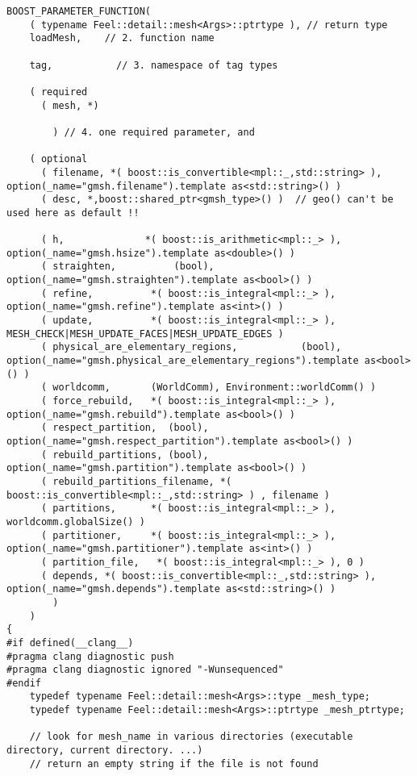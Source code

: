 \documentclass[12pt]{article}
\begin{document}
\begin{lstlisting}
BOOST_PARAMETER_FUNCTION(
    ( typename Feel::detail::mesh<Args>::ptrtype ), // return type
    loadMesh,    // 2. function name

    tag,           // 3. namespace of tag types

    ( required
      ( mesh, *)

        ) // 4. one required parameter, and

    ( optional
      ( filename, *( boost::is_convertible<mpl::_,std::string> ), option(_name="gmsh.filename").template as<std::string>() )
      ( desc, *,boost::shared_ptr<gmsh_type>() )  // geo() can't be used here as default !!

      ( h,              *( boost::is_arithmetic<mpl::_> ), option(_name="gmsh.hsize").template as<double>() )
      ( straighten,          (bool), option(_name="gmsh.straighten").template as<bool>() )
      ( refine,          *( boost::is_integral<mpl::_> ), option(_name="gmsh.refine").template as<int>() )
      ( update,          *( boost::is_integral<mpl::_> ), MESH_CHECK|MESH_UPDATE_FACES|MESH_UPDATE_EDGES )
      ( physical_are_elementary_regions,		   (bool), option(_name="gmsh.physical_are_elementary_regions").template as<bool>() )
      ( worldcomm,       (WorldComm), Environment::worldComm() )
      ( force_rebuild,   *( boost::is_integral<mpl::_> ), option(_name="gmsh.rebuild").template as<bool>() )
      ( respect_partition,	(bool), option(_name="gmsh.respect_partition").template as<bool>() )
      ( rebuild_partitions,	(bool), option(_name="gmsh.partition").template as<bool>() )
      ( rebuild_partitions_filename, *( boost::is_convertible<mpl::_,std::string> )	, filename )
      ( partitions,      *( boost::is_integral<mpl::_> ), worldcomm.globalSize() )
      ( partitioner,     *( boost::is_integral<mpl::_> ), option(_name="gmsh.partitioner").template as<int>() )
      ( partition_file,   *( boost::is_integral<mpl::_> ), 0 )
      ( depends, *( boost::is_convertible<mpl::_,std::string> ), option(_name="gmsh.depends").template as<std::string>() )
        )
    )
{
#if defined(__clang__)
#pragma clang diagnostic push
#pragma clang diagnostic ignored "-Wunsequenced"
#endif
    typedef typename Feel::detail::mesh<Args>::type _mesh_type;
    typedef typename Feel::detail::mesh<Args>::ptrtype _mesh_ptrtype;

    // look for mesh_name in various directories (executable directory, current directory. ...)
    // return an empty string if the file is not found


\end{lstlisting}
\end{document}
